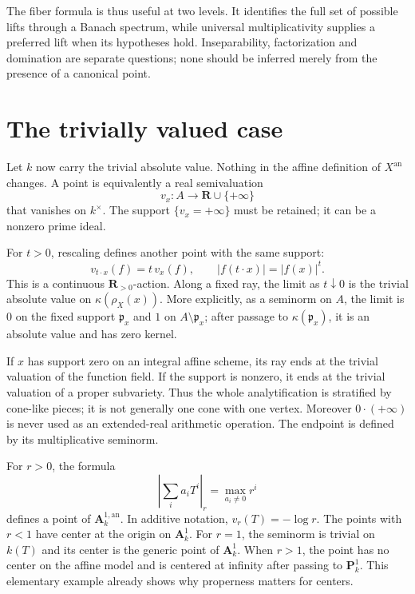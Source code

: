 The fiber formula is thus useful at two levels. It identifies the full
set of possible lifts through a Banach spectrum, while universal
multiplicativity supplies a preferred lift when its hypotheses hold.
Inseparability, factorization and domination are separate questions;
none should be inferred merely from the presence of a canonical point.

\section{The trivially valued case}
\label{sec:berk-trivial}

Let $k$ now carry the trivial absolute value. Nothing in the affine
definition of $X^{\mathrm{an}}$ changes. A point is equivalently a real
semivaluation
\[
 v_x:A\longrightarrow\mathbf R\cup\{+\infty\}
\]
that vanishes on $k^\times$. The support
$\{v_x=+\infty\}$ must be retained; it can be a nonzero prime ideal.

For $t>0$, rescaling defines another point with the same support:
\[
                v_{t\cdot x}(f)=t\,v_x(f),
       \qquad |f(t\cdot x)|=|f(x)|^t.
\]
This is a continuous $\mathbf R_{>0}$-action. Along a fixed ray, the limit
as $t\downarrow0$ is the trivial absolute value on
$\kappa(\rho_X(x))$. More explicitly, as a seminorm on $A$, the limit is
$0$ on the fixed support $\mathfrak p_x$ and $1$ on
$A\setminus\mathfrak p_x$; after passage to
$\kappa(\mathfrak p_x)$, it is an absolute value and has zero kernel.

\begin{remark}
\label{rem:berk-trivial-cone-strata}
If $x$ has support zero on an integral affine scheme, its ray ends at the
trivial valuation of the function field. If the support is nonzero, it ends
at the trivial valuation of a proper subvariety. Thus the whole
analytification is stratified by cone-like pieces; it is not generally one
cone with one vertex. Moreover $0\cdot(+\infty)$ is never used as an
extended-real arithmetic operation. The endpoint is defined by its
multiplicative seminorm.
\end{remark}

\begin{example}
\label{ex:berk-trivial-affine-line}
For $r>0$, the formula
\[
 \left|\sum_i a_iT^i\right|_r=\max_{a_i\neq0}r^i
\]
defines a point of $\mathbf A^{1,\mathrm{an}}_k$. In additive notation,
$v_r(T)=-\log r$. The points with $r<1$ have center at the origin on
$\mathbf A^1_k$. For $r=1$, the seminorm is trivial on $k(T)$ and its
center is the generic point of $\mathbf A^1_k$. When $r>1$, the point
has no center on the affine model and is centered at infinity after passing
to $\mathbf P^1_k$. This elementary example already shows why properness
matters for centers.
\end{example}


